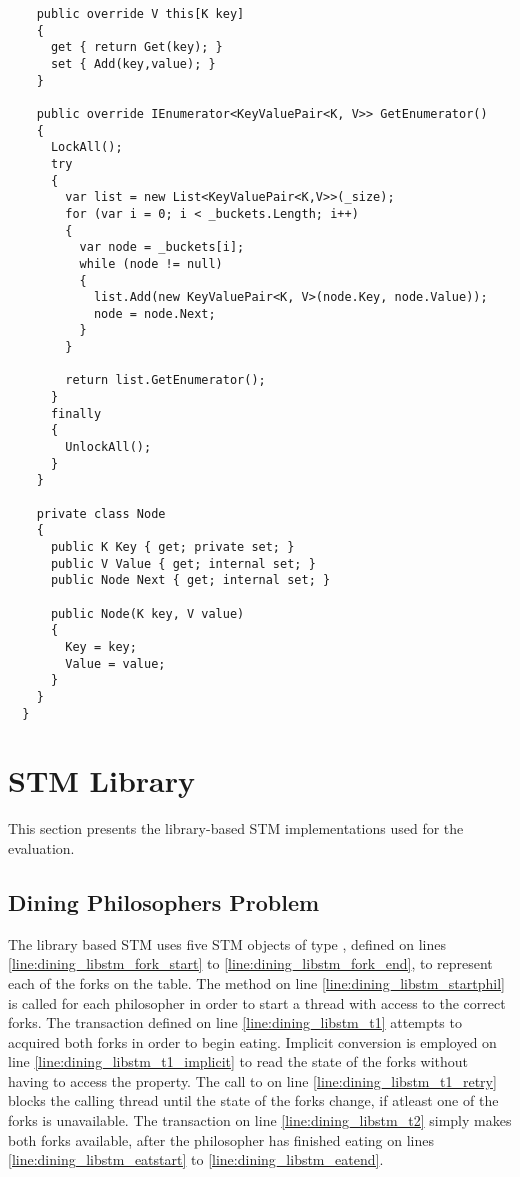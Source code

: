 \begin{lstlisting}
    public override V this[K key]
    {
      get { return Get(key); }
      set { Add(key,value); }
    }

    public override IEnumerator<KeyValuePair<K, V>> GetEnumerator()
    {
      LockAll();
      try
      {
        var list = new List<KeyValuePair<K,V>>(_size);
        for (var i = 0; i < _buckets.Length; i++)
        {
          var node = _buckets[i];
          while (node != null)
          {
            list.Add(new KeyValuePair<K, V>(node.Key, node.Value));
            node = node.Next;
          }
        }

        return list.GetEnumerator();
      }
      finally
      {
        UnlockAll();
      }
    }

    private class Node
    {
      public K Key { get; private set; }
      public V Value { get; internal set; }
      public Node Next { get; internal set; }

      public Node(K key, V value)
      {
        Key = key;
        Value = value;
      }
    }
  }
\end{lstlisting}
\section{STM Library}\label{app:impl_stm_lib}
This section presents the library-based \ac{STM} implementations used for the evaluation.
\subsection{Dining Philosophers Problem}
The library based \ac{STM} uses five \ac{STM} objects of type , defined on lines \ref{line:dining_libstm_fork_start} to \ref{line:dining_libstm_fork_end}, to represent each of the forks on the table. The  method on line \ref{line:dining_libstm_startphil} is called for each philosopher in order to start a thread with access to the correct forks. The transaction defined on line \ref{line:dining_libstm_t1} attempts to acquired both forks in order to begin eating. Implicit conversion is employed on line \ref{line:dining_libstm_t1_implicit} to read the state of the forks without having to access the  property. The call to  on line \ref{line:dining_libstm_t1_retry} blocks the calling thread until the state of the forks change, if atleast one of the forks is unavailable. The transaction on line \ref{line:dining_libstm_t2} simply makes both forks available, after the philosopher has finished eating on lines \ref{line:dining_libstm_eatstart} to \ref{line:dining_libstm_eatend}.

